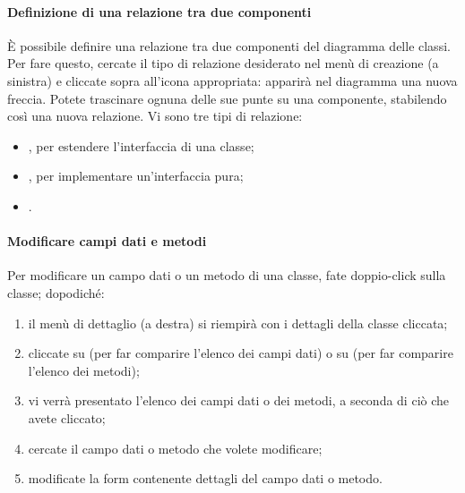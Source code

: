 \paragraph{Definizione di una relazione tra due componenti} È possibile definire una relazione tra due componenti del diagramma delle classi. Per fare questo, cercate il tipo di relazione desiderato nel menù di creazione (a sinistra) e cliccate sopra all'icona appropriata: apparirà nel diagramma una nuova freccia. Potete trascinare ognuna delle sue punte su una componente, stabilendo così una nuova relazione. Vi sono tre tipi di relazione:
\begin{itemize}
	\item {}, per estendere l'interfaccia di una classe;
	\item {}, per implementare un'interfaccia pura;
	\item {}. %
\end{itemize}

\paragraph{Modificare campi dati e metodi} Per modificare un campo dati o un metodo di una classe, fate doppio-click sulla classe; dopodiché:
\begin{enumerate}
	\item il menù di dettaglio (a destra) si riempirà con i dettagli della classe cliccata;
	\item cliccate su  (per far comparire l'elenco dei campi dati) o su  (per far comparire l'elenco dei metodi);
	\item vi verrà presentato l'elenco dei campi dati o dei metodi, a seconda di ciò che avete cliccato;
	\item cercate il campo dati o metodo che volete modificare;
	\item modificate la form contenente dettagli del campo dati o metodo.
\end{enumerate}



